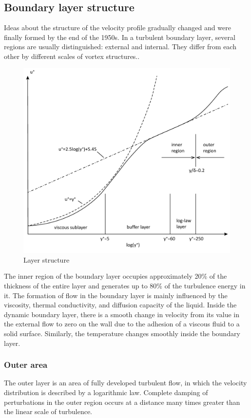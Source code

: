 \subsection{Boundary layer structure}
	Ideas about the structure of the velocity profile gradually changed and were finally formed by the end of the 1950s. In a turbulent boundary layer, several regions are usually distinguished: external and internal. They differ from each other by different scales of vortex structures.\cite{Белов2001}.
	\begin{figure}[H]
		\centering
		\includegraphics[width=0.7\linewidth]{../Assets/ПогранСлойEN}
		\caption{Layer structure}
	\end{figure}
	The inner region of the boundary layer occupies approximately 20\% of the thickness of the entire layer and generates up to 80\% of the turbulence energy in it. The formation of flow in the boundary layer is mainly influenced by the viscosity, thermal conductivity, and diffusion capacity of the liquid. Inside the dynamic boundary layer, there is a smooth change in velocity from its value in the external flow to zero on the wall due to the adhesion of a viscous fluid to a solid surface. Similarly, the temperature changes smoothly inside the boundary layer.

\subsubsection{Outer area}
	The outer layer is an area of fully developed turbulent flow, in which the velocity distribution is described by a logarithmic law. Complete damping of perturbations in the outer region occurs at a distance many times greater than the linear scale of turbulence.
	
